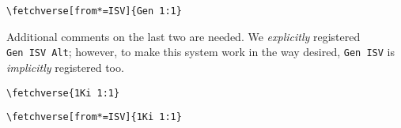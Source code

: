 \documentclass{article}
\begin{document}
\bigskip
\verb|\fetchverse[from*=ISV]{Gen 1:1}|\\[3pt]

Additional comments on the last two are needed. We \emph{explicitly} registered
\texttt{Gen~ISV~Alt}; however, to make this system work in the way desired,
\texttt{Gen~ISV} is \emph{implicitly} registered too.

\verb|\fetchverse{1Ki 1:1}|\\[3pt]

\bigskip

\verb|\fetchverse[from*=ISV]{1Ki 1:1}|\\[3pt]
\end{document}
